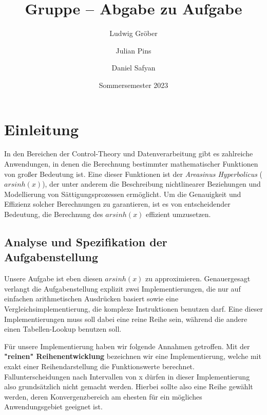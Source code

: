 \documentclass[course=erap] {aspdoc}
\author{Ludwig Gröber \and Julian Pins \and Daniel Safyan}
\date{Sommersemester 2023} %
\title{Gruppe \theGroup{} -- Abgabe zu Aufgabe \theNumber}
\begin{document}
     \maketitle
 
 
     \section{Einleitung}
     In den Bereichen der Control-Theory und Datenverarbeitung gibt es zahlreiche Anwendungen, in denen die Berechnung bestimmter mathematischer Funktionen von großer Bedeutung ist. Eine dieser Funktionen ist der \textit{Areasinus Hyperbolicus} ($arsinh(x)$), der unter anderem die Beschreibung nichtlinearer Beziehungen und Modellierung von Sättigungsprozessen ermöglicht. Um die Genauigkeit und Effizienz solcher Berechnungen zu garantieren, ist es von entscheidender Bedeutung, die Berechnung des $arsinh(x)$ effizient umzusetzen.  
     
 
 
 
     \subsection{Analyse und Spezifikation der Aufgabenstellung}
     Unsere Aufgabe ist eben diesen $arsinh(x)$ zu approximieren.
     Genauergesagt verlangt die Aufgabenstellung explizit zwei Implementierungen, die nur auf einfachen arithmetischen Ausdrücken basiert sowie eine Vergleichsimplementierung, die komplexe Instruktionen benutzen darf. Eine dieser Implementierungen muss soll dabei eine reine Reihe sein, während die andere einen Tabellen-Lookup benutzen soll.
    
     Für unsere Implementierung haben wir folgende Annahmen getroffen.
     Mit der \textbf{"reinen"  Reihenentwicklung} bezeichnen wir eine Implementierung, welche mit exakt einer Reihendarstellung die Funktionswerte berechnet. Fallunterscheidungen nach Intervallen von x dürfen in dieser Implementierung also grundsätzlich nicht gemacht werden. Hierbei sollte also eine Reihe gewählt werden, deren Konvergenzbereich am ehesten für ein mögliches Anwendungsgebiet geeignet ist.
    
\end{document}
